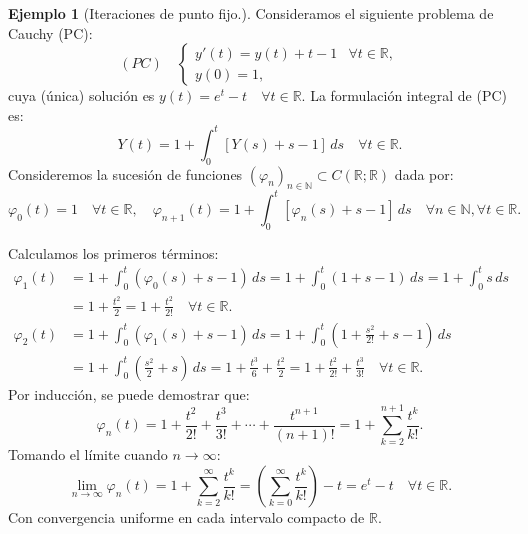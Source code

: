 \documentclass[11pt]{article}
\theoremstyle{definition} %
\newtheorem{example}[theorem]{Ejemplo}
\newcommand{\R}{\mathbb{R}}
\newcommand{\N}{\mathbb{N}}
\begin{document}
\begin{example}[Iteraciones de punto fijo.]
  Consideramos el siguiente problema de Cauchy (PC):
\[
  (PC) \quad \begin{cases}
  y'(t) = y(t) + t - 1 & \forall t \in \R, \\
  y(0) = 1,
  \end{cases}
\]
cuya (única) solución es $y(t) = e^t - t \quad \forall t \in \R$. La formulación integral de (PC) es:
\[
  Y(t) = 1 + \int_{0}^{t} [Y(s) + s - 1] \,ds \quad \forall t \in \R.
\]
Consideremos la sucesión de funciones $(\varphi_n)_{n \in \N} \subset C(\R; \R)$ dada por:
\[
  \varphi_0(t) = 1 \quad \forall t \in \R, \quad
  \varphi_{n+1}(t) = 1 + \int_{0}^{t} [\varphi_n(s) + s - 1] \,ds \quad \forall n \in \N, \forall t \in \R. 
\]

Calculamos los primeros términos:
\[
  \begin{align*}
    \varphi_1(t) &= 1 + \int_{0}^{t} (\varphi_0(s) + s - 1) \,ds = 1 + \int_{0}^{t} (1 + s - 1) \,ds = 1 + \int_{0}^{t} s \,ds \\
    &= 1 + \frac{t^2}{2} = 1 + \frac{t^2}{2!} \quad \forall t \in \mathbb{R}. \\
    \varphi_2(t) &= 1 + \int_{0}^{t} (\varphi_1(s) + s - 1) \,ds = 1 + \int_{0}^{t} \left(1 + \frac{s^2}{2!} + s - 1\right) \,ds \\
    &= 1 + \int_{0}^{t} \left(\frac{s^2}{2} + s\right) \,ds = 1 + \frac{t^3}{6} + \frac{t^2}{2} = 1 + \frac{t^2}{2!} + \frac{t^3}{3!} \quad \forall t \in \R.
  \end{align*}
\]
Por inducción, se puede demostrar que:
\[ 
  \varphi_n(t) = 1 + \frac{t^2}{2!} + \frac{t^3}{3!} + \cdots + \frac{t^{n+1}}{(n+1)!} = 1 + \sum_{k=2}^{n+1} \frac{t^k}{k!}.
\]
Tomando el límite cuando $n \to \infty$:
\[ 
  \lim_{n \to \infty} \varphi_n(t) = 1 + \sum_{k=2}^{\infty} \frac{t^k}{k!} = \left(\sum_{k=0}^{\infty} \frac{t^k}{k!}\right) - t = e^t - t \quad \forall t \in \R. 
\]
Con convergencia uniforme en cada intervalo compacto de $\R$.
\end{example}
\end{document}
